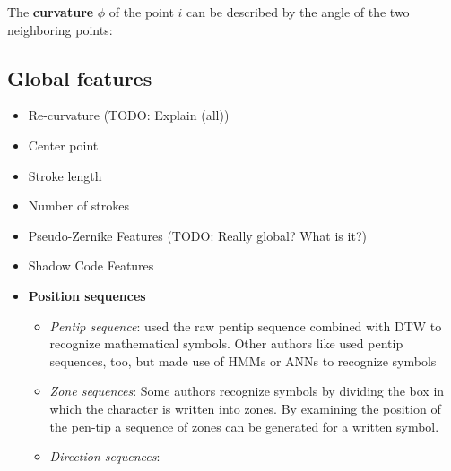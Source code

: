 The \textbf{curvature} $\phi$ of the point $i$ can be described by the
angle of the two neighboring points:


\subsection{Global features}
\begin{itemize}
    \item Re-curvature\cite{Huang06} (TODO: Explain (all))
    \item Center point\cite{Huang06}
    \item Stroke length\cite{Huang06}
    \item Number of strokes\cite{Huang09}
    \item Pseudo-Zernike Features (TODO: Really global? What is it?)\cite{Khotanzad}
    \item Shadow Code Features\cite{Khotanzad}
    \item \textbf{Position sequences}
    \begin{itemize}
        \item \textit{Pentip sequence}: \cite{Kirsch} used the raw pentip
              sequence combined with \gls{DTW} to recognize mathematical symbols.
              Other authors like \cite{Koschinski95} used pentip sequences, too,
              but made use of \glspl{HMM} or \glspl{ANN} to recognize symbols
        \item \textit{Zone sequences}: Some authors \cite{Brown1964,Hanaki80}
          recognize symbols by
          dividing the box in which the character is written into zones. By examining the position of the pen-tip a sequence of zones can be generated for a written
          symbol.
        \item \textit{Direction sequences}:
    \end{itemize}
\end{itemize}